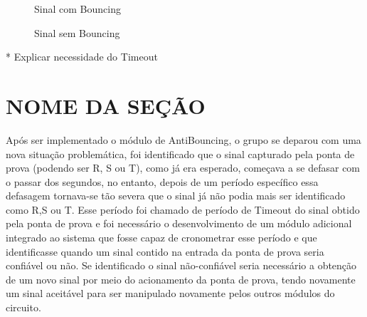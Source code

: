 \documentclass[12pt,a4paper,openany]{abntex2}
\begin{document}
\begin{figure}[!htp]
	\centering
		\caption{Sinal com Bouncing}
	\label{fig:sinal-com-bouncing}
\end{figure}

\begin{figure}[!htp]
	\centering
		\caption{Sinal sem Bouncing}
	\label{fig:sinal-sem-bouncing}
\end{figure}

* Explicar necessidade do Timeout
\section{NOME DA SEÇÃO}

  Após ser implementado o módulo de AntiBouncing, o grupo se deparou com uma nova
situação problemática, foi identificado que o sinal capturado pela ponta de prova
(podendo ser R, S ou T), como já era esperado, começava a se defasar com o passar
dos segundos, no entanto, depois de um período específico essa defasagem tornava-se
tão severa que o sinal já não podia mais ser identificado como R,S ou T.
  Esse período foi chamado de período de Timeout do sinal obtido pela ponta de prova
e foi necessário o desenvolvimento de um módulo adicional integrado ao sistema que
fosse capaz de cronometrar esse período e que identificasse quando um sinal contido
na entrada da ponta de prova seria confiável ou não.
  Se identificado o sinal não-confiável seria necessário a obtenção de um novo sinal
por meio do acionamento da ponta de prova, tendo novamente um sinal aceitável para
ser manipulado novamente pelos outros módulos do circuito.



\end{document}

